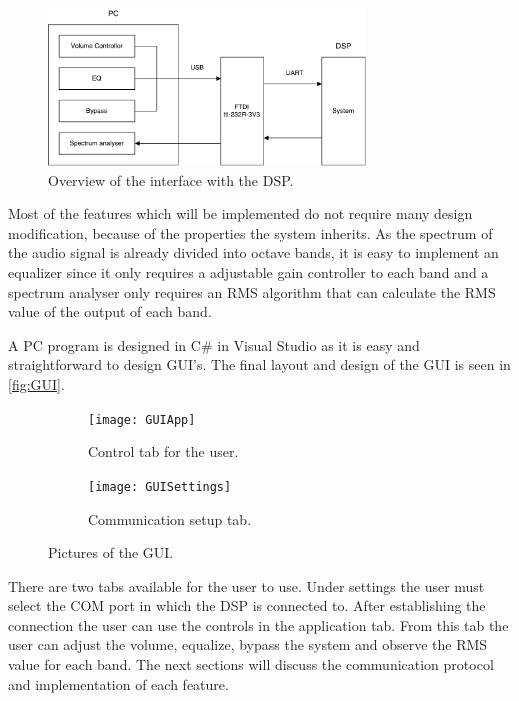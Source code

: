 \begin{figure}[H]
\centering
\includegraphics[width=0.75\textwidth]{figures/communicationBlock.pdf}
\caption{Overview of the interface with the DSP.}
\label{fig:communicationBlock}
\end{figure}

Most of the features which will be implemented do not require many design modification, because of the properties the system inherits. As the spectrum of the audio signal is already divided into octave bands, it is easy to implement an equalizer since it only requires a adjustable gain controller to each band and a spectrum analyser only requires an RMS algorithm that can calculate the RMS value of the output of each band. 

A PC program is designed in C\# in Visual Studio as it is easy and straightforward to design GUI's. The final layout and design of the GUI is seen in \autoref{fig:GUI}.

\begin{figure}[H]
\centering
\begin{subfigure}[t]{0.85\textwidth}
\texttt{[image: GUIApp]}
	\caption{Control tab for the user.}
	\label{fig:GUIApp}
\end{subfigure}
\hspace{6mm} 
\begin{subfigure}[t]{0.85\textwidth}
\texttt{[image: GUISettings]}
	\caption{Communication setup tab.}
	\label{fig:GUISettings}
\end{subfigure}
\caption{Pictures of the GUI.}
\label{fig:GUI}
\end{figure}

There are two tabs available for the user to use. Under settings the user must select the COM port in which the DSP is connected to. After establishing the connection the user can use the controls in the application tab. From this tab the user can adjust the volume, equalize, bypass the system and observe the RMS value for each band. The next sections will discuss the communication protocol and implementation of each feature.


